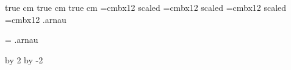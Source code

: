 
 true cm
 true cm
 true cm
\newcount\tit
\newcount\subtit
\newcount\teorema
\newcount\proposicio
\newcount\lema
\newcount\corolari
\font\ftitol=cmbx12 scaled 
\font\ftitolp=cmbx12 scaled 
\font\fsubtitol=cmbx12 scaled 
\font\ftitolpp =cmbx12
\newwrite\arnaufile\newif\ifarnaufileopened
\def\openarnaufile{\ifarnaufileopened\else
\arnaufileopenedtrue
\immediate\openout\arnaufile = \jobname.arnau
\fi}
\newif\ifrewritearnaufile \rewritearnaufiletrue
\def\readarnaufile{\testfileexistence{arnau}
\iffileexists
 \jobname.arnau
\ifrewritearnaufile\openarnaufile\fi
\fi}
\readarnaufile
\openarnaufile
\def\ifDefinedCs#1{\expandafter
\ifx\csname#1\endcsname\relax}
\advance\voffset by 2\baselineskip
\advance\vsize by -2\baselineskip
\def\capsalera#1{
\def\makeheadline{\vbox to 0
pt{\vss\noindent {
\ifodd \pageno
							{\hfill{\sevenrm	#1}\ \ {\bf\the\pageno}}
\else
							{\ifnum\tit=0
													{{\bf\the\pageno}\ \ {\sevenrm Problemes d'estad\'{\i}stica. Enginyeries T\`ecniques de
Inform\`atica de Gesti\'o i de Sistemes}\hfill}
						 \else
															{{\bf\the\pageno}\ \ {\sevenrm 
																						{\part}}\hfill}
							\fi}
\fi}
\break\vskip -0.3cm
\hrule}
\vskip\baselineskip
}
}
\def\capsaleraDos#1{
\def\makeheadline{\vbox to 0
pt{\vss\noindent {
							{\hfill{\sevenrm	#1}\ \ {\bf\the\pageno}}
}
\break\vskip -0.3cm
\hrule}
\vskip\baselineskip
}
}
\footline{}
\def\seccionrep#1{{\ftitolp {\uppercase\expandafter{\romannumeral
\the\tit}} .\ #1}}
%
\def\seccion#1#2{\seccio=0\global\subtit=0\global\advance\tit by
1\vfill\eject\ \vskip8cm\rightline{\ftitol  {\uppercase\expandafter{\romannumeral
\the\tit}} .\
#1}\vskip1cm\rightline{\ftitol #2}\def\part{#1#2}\def\makeheadline{}
\vfill\eject{\noindent\seccionrep{#1#2}}\capsalera{#1#2}}
\def\seccionDos#1#2{\seccio=0\global\subtit=0\global\advance\tit by
1\vfill\eject\ \vskip8cm\rightline{\ftitol
{\uppercase\expandafter{\romannumeral
\the\tit}} .\
#1}\vskip1cm\rightline{\ftitol #2}\def\makeheadline{}
\vfill\eject{\noindent\seccionrep{#1#2}}\capsaleraDos{#1#2}}
